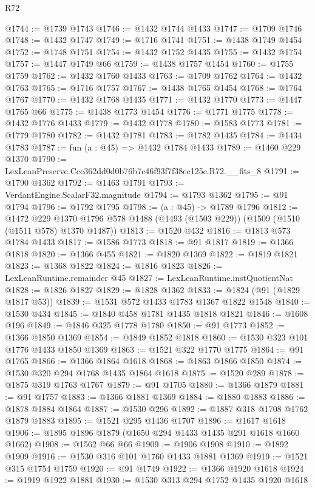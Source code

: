 \begin{lexlean}{R72}
\begin{coremodule}
@1744 := @1739 @1743
@1746 := @1432 @1744 @1433
@1747 := @1709 @1746
@1748 := @1432 @1747
@1749 := @1716 @1741
@1751 := @1438 @1749 @1454
@1752 := @1748 @1751
@1754 := @1432 @1752 @1435
@1755 := @1432 @1754
@1757 := @1447 @1749 @66
@1759 := @1438 @1757 @1454
@1760 := @1755 @1759
@1762 := @1432 @1760 @1433
@1763 := @1709 @1762
@1764 := @1432 @1763
@1765 := @1716 @1757
@1767 := @1438 @1765 @1454
@1768 := @1764 @1767
@1770 := @1432 @1768 @1435
@1771 := @1432 @1770
@1773 := @1447 @1765 @66
@1775 := @1438 @1773 @1454
@1776 := @1771 @1775
@1778 := @1432 @1776 @1433
@1779 := @1432 @1778
@1780 := @1583 @1773
@1781 := @1779 @1780
@1782 := @1432 @1781
@1783 := @1782 @1435
@1784 := @1434 @1783
@1787 := fun (a : @45) => @1432 @1784 @1433
@1789 := @1460 @229 @1370
@1790 := LexLeanPreserve.Ccc362dd0d0b76b7c46f93f7f38ec125e.R72.__fits_8
@1791 := @1790 @1362
@1792 := @1463 @1791
@1793 := VerdantEngine.ScalarF32.magnitude
@1794 := @1793 @1362
@1795 := @91 @1794
@1796 := @1792 @1795
@1798 := (a : @45) -> @1789 @1796
@1812 := @1472
    @229
    @1370
    @1796
    @578
    @1488
    (@1493 (@1503 @229))
    (@1509 (@1510 (@1511 @578) @1370 @1487))
@1813 := @1520 @432
@1816 := @1813 @573 @1784 @1433
@1817 := @1586 @1773
@1818 := @91 @1817
@1819 := @1366 @1818
@1820 := @1366 @455
@1821 := @1820 @1369
@1822 := @1819 @1821
@1823 := @1368 @1822
@1824 := @1816 @1823
@1826 := LexLeanRuntime.remainder @45
@1827 := LexLeanRuntime.instQuotientNat
@1828 := @1826 @1827
@1829 := @1828 @1362
@1833 := @1824 (@91 (@1829 @1817 @53))
@1839 := @1531 @572 @1433 @1783 @1367 @1822 @1548
@1840 := @1530 @434
@1845 := @1840 @458 @1781 @1435 @1818 @1821
@1846 := @1608 @196
@1849 := @1846 @325 @1778 @1780
@1850 := @91 @1773
@1852 := @1366 @1850 @1369
@1854 := @1849 @1852 @1818
@1860 := @1530 @323 @101 @1776 @1433 @1850 @1369
@1863 := @1521 @322 @1770 @1775
@1864 := @91 @1765
@1866 := @1366 @1864 @1618
@1868 := @1863 @1866 @1850
@1874 := @1530 @320 @294 @1768 @1435 @1864 @1618
@1875 := @1520 @289
@1878 := @1875 @319 @1763 @1767
@1879 := @91 @1705
@1880 := @1366 @1879
@1881 := @91 @1757
@1883 := @1366 @1881 @1369
@1884 := @1880 @1883
@1886 := @1878 @1884 @1864
@1887 := @1530 @296
@1892 := @1887 @318 @1708 @1762 @1879 @1883
@1895 := @1521 @295 @1436 @1707
@1896 := @1617 @1618
@1906 := @1895 @1896 @1879 (@1650 @294 @1433 @1435 @291 @1618 @1660 @1662)
@1908 := @1562 @66 @66
@1909 := @1906 @1908
@1910 := @1892 @1909
@1916 := @1530 @316 @101 @1760 @1433 @1881 @1369
@1919 := @1521 @315 @1754 @1759
@1920 := @91 @1749
@1922 := @1366 @1920 @1618
@1924 := @1919 @1922 @1881
@1930 := @1530 @313 @294 @1752 @1435 @1920 @1618

\end{coremodule}
\end{lexlean}
